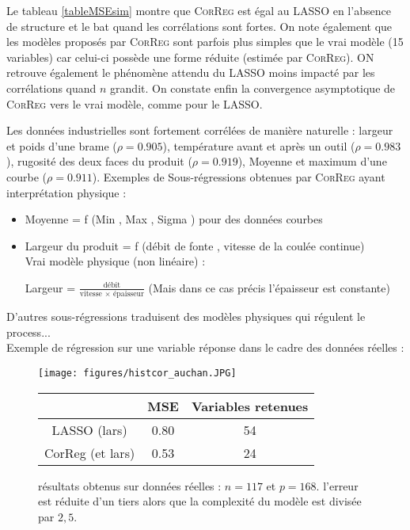 \documentclass[12pt]{article}
\begin{document}
Le tableau \ref{tableMSEsim} montre que \textsc{CorReg} est égal au LASSO en l'absence de structure et le bat quand les corrélations sont fortes. On note également que les modèles proposés par 
\textsc{CorReg} sont parfois plus simples que le vrai modèle (15 variables) car celui-ci possède une forme réduite (estimée par \textsc{CorReg}). ON retrouve également le phénomène attendu du LASSO moins impacté par les corrélations quand $n$ grandit. On constate enfin la convergence asymptotique de \textsc{CorReg} vers le vrai modèle, comme pour le LASSO.

Les données industrielles sont fortement corrélées de manière naturelle : largeur et poids d'une brame ($\rho=0.905$), température avant et après un outil ($\rho=0.983$), rugosité des deux faces du produit ($\rho=0.919$), Moyenne et maximum d'une courbe ($\rho=0.911$).
Exemples de Sous-régressions obtenues par \textsc{CorReg} ayant interprétation physique :
\begin{itemize}
	\item Moyenne = f (Min , Max , Sigma ) pour des données courbes
	\item Largeur du produit = f (débit de fonte , vitesse de la coulée continue)	\\
Vrai modèle physique (non linéaire) :

	 Largeur = $\frac{\textrm{débit}}{\textrm{vitesse } \times \textrm{ épaisseur}}$ (Mais dans ce cas précis l'épaisseur est constante)
			\end{itemize}
			
			D'autres sous-régressions traduisent des modèles physiques qui régulent le process...
\\

Exemple de régression sur une variable réponse dans le cadre des données réelles :
\begin{figure}[!h]
	\begin{minipage}[c]{.40\linewidth}
			\texttt{[image: figures/histcor\_auchan.JPG]} 
	\end{minipage} \hfill
   \begin{minipage}[c]{.52\linewidth}
		\begin{tabular}{|c|c|c|}
		\hline 
		  & MSE  & Variables retenues  \\ 
		\hline
		LASSO (lars) & 0.80 & 54 \\ 
		\hline 
		CorReg (et lars) & 0.53 & 24  \\ 
		\hline 
		\end{tabular} 
   \end{minipage}
   \caption{résultats obtenus sur données réelles : $n=117$ et $p=168$. l'erreur est réduite d'un tiers alors que la complexité du modèle est divisée par $2,5$.   }
\end{figure}   
	
\end{document}
